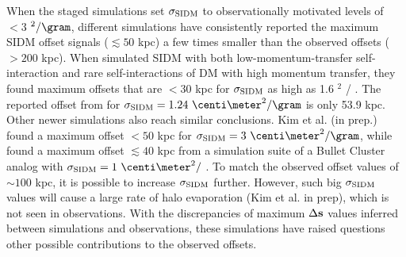  
When the staged simulations set $\sigma_{\rm SIDM}$ to observationally motivated 
levels of $< 3$ \centi\meter$^2 / \gram$, 
different simulations have consistently reported the maximum SIDM offset 
signals ($\lesssim 50$ kpc) a few times smaller than the observed offsets 
($ > 200$ kpc). 
When \cite{Kahlhoefer14} simulated SIDM with both low-momentum-transfer 
self-interaction 
and rare self-interactions of DM with high momentum transfer, they found maximum 
offsets that are $< 30$ kpc for $\sigma_{\rm SIDM}$ as high as 1.6 \centi\meter$^2$ / \gram.
The reported offset from \cite{Randall2008d}
for $\sigmaSIDM = 1.24~\centi\meter^2 / \gram$ is only 53.9 kpc. 
Other newer simulations also reach similar conclusions.
Kim et al. (in prep.) found a maximum offset $< 50$ kpc for 
$\sigmaSIDM = 3~\centi\meter^2 / \gram$, while
\cite{Robertson2016} found a maximum offset $\lesssim 40$ kpc  
 from a simulation suite of a Bullet Cluster analog 
 with $\sigmaSIDM = 1~\centi\meter^2 /$ \gram.
To match the observed offset values of $\sim 100$ kpc, it is possible 
to increase $\sigma_{\rm SIDM}$ further. However, such big $\sigma_{\rm SIDM}$ values will
cause a large rate of halo evaporation (Kim et al. in prep), which is not seen
in observations.
With the discrepancies of maximum $\Delta {\bf s}$ values inferred between simulations 
and observations,
these simulations have raised questions other possible contributions to the
observed offsets.  

